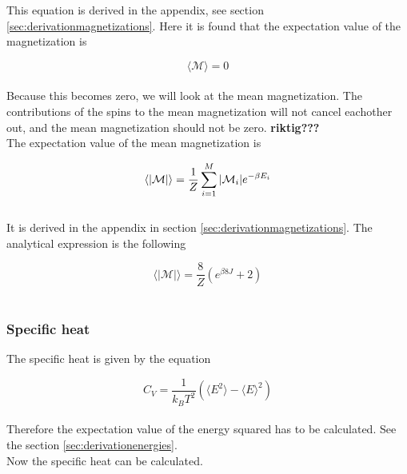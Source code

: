 \documentclass{article}
\begin{document}
This equation is derived in the appendix, see section \ref{sec:derivationmagnetizations}. Here it is found that the expectation value of the magnetization is

\begin{equation} \label{eq:finalmagnetization}
    \langle \mathcal{M} \rangle = 0
\end{equation} \\

Because this becomes zero, we will look at the mean magnetization. The contributions of the spins to the mean magnetization will not cancel eachother out, and the mean magnetization should not be zero. \textbf{riktig???} \\

The expectation value of the mean magnetization is

\begin{equation}    \label{eq:meanmagnetization}
    \langle |\mathcal{M}| \rangle = \frac{1}{Z} \sum _{i=1} ^M |\mathcal{M}_i| e^{- \beta E_i} \\
\end{equation} \\

It is derived in the appendix in section \ref{sec:derivationmagnetizations}. The analytical expression is the following

\begin{equation} \label{eq:finalmeanmagnetization}
    \langle | \mathcal{M} | \rangle = \frac{8}{Z} \left( e^{\beta 8J} + 2 \right)
\end{equation} \\


\subsubsection{Specific heat} \label{sec:specificheat}

The specific heat is given by the equation

\begin{equation}    \label{eq:specificheat}
    C_V = \frac{1}{k_B T^2} \left( \langle E^2 \rangle - \langle E \rangle ^2 \right)
\end{equation} \\

Therefore the expectation value of the energy squared has to be calculated. See the section \ref{sec:derivationenergies}. \\

Now the specific heat can be calculated.
\end{document}

